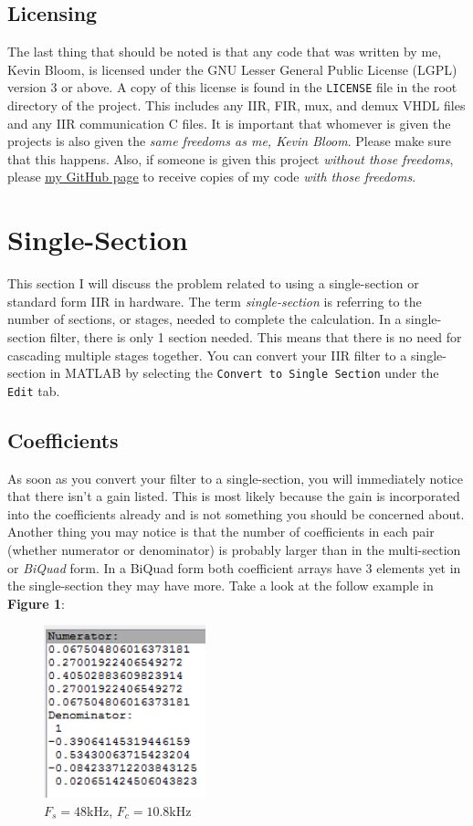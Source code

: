 \documentclass[12pt,a4paper,titlepage]{article}
\begin{document}
\subsection{Licensing}
The last thing that should be noted is that any code that was written by me,
Kevin Bloom, is licensed under the GNU Lesser General Public License (LGPL)
version 3 or above. A copy of this license is found in the \texttt{LICENSE} file
in the root directory of the project. This includes any IIR, FIR, mux, and demux
VHDL files and any IIR communication C files. It is important that whomever is
given the projects is also given the \emph{same freedoms as me, Kevin
  Bloom}. Please make sure that this happens. Also, if someone is given this
project \emph{without those freedoms}, please
\underline{\href{https://github.com/nuclearkev/iir-hardware}{my GitHub page}} to
receive copies of my code \emph{with those freedoms}.


\section{Single-Section}
This section I will discuss the problem related to using a single-section or
standard form IIR in hardware. The term \emph{single-section} is referring to
the number of sections, or stages, needed to complete the calculation. In a
single-section filter, there is only 1 section needed. This means that there is
no need for cascading multiple stages together. You can convert your IIR filter
to a single-section in MATLAB by selecting the \texttt{Convert to Single
  Section} under the \texttt{Edit} tab.

\subsection{Coefficients}
As soon as you convert your filter to a single-section, you will immediately
notice that there isn't a gain listed. This is most likely because the gain is
incorporated into the coefficients already and is not something you should be
concerned about. Another thing you may notice is that the number of coefficients
in each pair (whether numerator or denominator) is probably larger than in the
multi-section or \emph{BiQuad} form. In a BiQuad form both coefficient arrays
have 3 elements yet in the single-section they may have more. Take a look at the
follow example in \textbf{Figure 1}:

\begin{figure}[!htb]
  \centering
  \includegraphics[height=5cm]
                  {../presentation/standard-coeffs-48kfs-10800fc.png}
                  \caption{$F_s = 48$kHz, $F_c = 10.8$kHz}
\end{figure}
\end{document}
